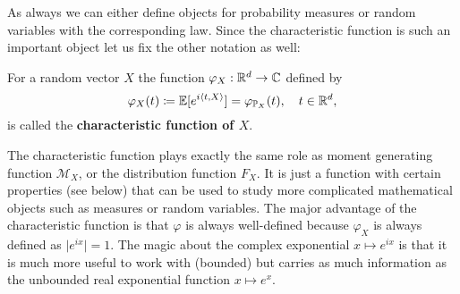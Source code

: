 As always we can either define objects for probability measures or random variables with the corresponding law. Since the characteristic function is such an important object let us fix the other notation as well:
\begin{ldef}
\begin{deff}
			For a random vector $X$ the function $\varphi_X:\mathbb{R}^d\to\mathbb{C}$ defined by $$\varphi_X(t) \coloneqq \mathbb{E}[e^{i \langle t, X \rangle}] = \varphi_{\mathbb{P}_X}(t), \quad t\in \mathbb{R}^d,$$ is called the \textbf{characteristic function of $X$}.
\end{deff}
\end{ldef}
			 The characteristic function plays exactly the same role as moment generating function $\mathcal M_X$, or the distribution function $F_X$. It is just a function with certain properties (see below) that can be used to study more complicated mathematical objects such as measures or random variables. The major advantage of the characteristic function is that $\varphi$ is always well-defined because $\varphi_X$ is always defined as $\lvert e^{ix} \rvert = 1$. The magic about the complex exponential $x\mapsto e^{ix}$ is that it is much more useful to work with (bounded) but carries as much information as the unbounded real exponential function $x\mapsto e^x$.\smallskip

